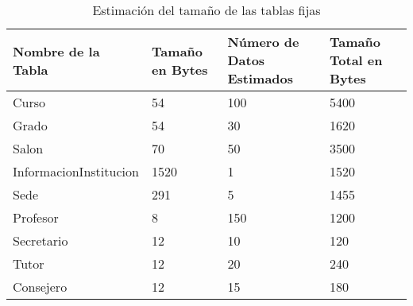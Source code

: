 \begin{table}[H]
	\centering
	\renewcommand{\arraystretch}{1.5}
	\begin{tabular}{|p{3.5cm}|p{3cm}|p{3cm}|p{2.5cm}|}
		\hline
		\textbf{Nombre de la Tabla} & \textbf{Tamaño en Bytes} & \textbf{Número de Datos Estimados} & \textbf{Tamaño Total en Bytes} \\
		\hline
		Curso                       & 54                       & 100                                & 5400                           \\
		\hline
		Grado                       & 54                       & 30                                 & 1620                           \\
		\hline
		Salon                       & 70                       & 50                                 & 3500                           \\
		\hline
		InformacionInstitucion      & 1520                     & 1                                  & 1520                           \\
		\hline
		Sede                        & 291                      & 5                                  & 1455                           \\
		\hline
		Profesor                    & 8                        & 150                                & 1200                           \\
		\hline
		Secretario                  & 12                       & 10                                 & 120                            \\
		\hline
		Tutor                       & 12                       & 20                                 & 240                            \\
		\hline
		Consejero                   & 12                       & 15                                 & 180                            \\
		\hline
	\end{tabular}
	\caption{Estimación del tamaño de las tablas fijas}
\end{table}